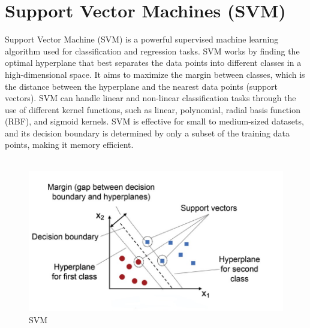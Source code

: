 \documentclass[12pt,a4paper]{report}
\begin{document}
\chapter{Support Vector Machines (SVM)}
Support Vector Machine (SVM) is a powerful supervised machine learning algorithm used for classification and regression tasks. SVM works by finding the optimal hyperplane that best separates the data points into different classes in a high-dimensional space. It aims to maximize the margin between classes, which is the distance between the hyperplane and the nearest data points (support vectors). SVM can handle linear and non-linear classification tasks through the use of different kernel functions, such as linear, polynomial, radial basis function (RBF), and sigmoid kernels. SVM is effective for small to medium-sized datasets, and its decision boundary is determined by only a subset of the training data points, making it memory efficient.\cite{analytics_yogi_svm}
\\
\\
\begin{figure}[htbp]
    \centering
    \includegraphics[width=\textwidth]{SVM.jpg}
    \caption{SVM}
    \label{fig:SVM}
\end{figure}
\\
\\
\\
\end{document}
